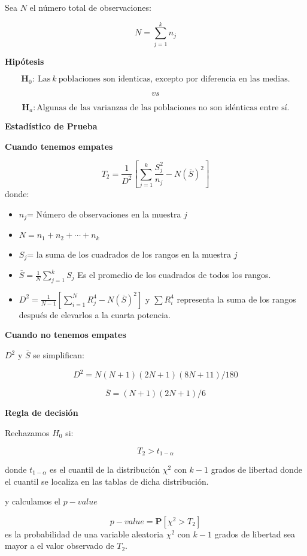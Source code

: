 \documentclass[
  a4paper,
  oneside,
  openany]{book}
\begin{document}
Sea \(N\) el número total de observaciones:

\[N=\sum_{j=1}^k n_j\]

\textbf{Hipótesis}

\[\textbf{H}_0: \ \mbox{Las} \  k  \ \mbox{poblaciones son identicas, excepto por diferencia en las medias.}\]

\[vs\]

\[\textbf{H}_a: \mbox{Algunas de las varianzas de las poblaciones no son idénticas entre sí.}\]

\textbf{Estadístico de Prueba}

\textbf{Cuando tenemos empates}

\[T_{2}= \frac{1}{D^2}\left[\sum_{j=1}^{k}\frac{S_{j}^2}{n_j}-N(\overline{S})^2\right]\]
donde:

\begin{itemize}
\item
  \(n_{j}\)= Número de observaciones en la muestra \(j\)
\item
  \(N= n_{1}+n_{2}+\cdots+n_{k}\)
\item
  \(S_{j}\)= la suma de los cuadrados de los rangos en la muestra \(j\)
\item
  \(\overline{S}= \frac{1}{N}\sum_{j=1}^{k}S_{j}\) Es el promedio de los cuadrados de todos los rangos.
\item
  \(D^2=\frac{1}{N-1}\left[\sum_{i=1}^{N}R^4_{j}-N(\overline{S})^2\right]\) y \(\sum{R_{i}^4}\) representa la suma de los rangos después de elevarlos a la cuarta potencia.
\end{itemize}

\textbf{Cuando no tenemos empates}

\(D^2\) y \(\overline{S}\) se simplifican:

\[D^2=N(N+1)(2N+1)(8N+11)/180\]

\[\overline{S}=(N+1)(2N+1)/6\]

\textbf{Regla de decisión}

Rechazamos \(H_0\) si:

\[T_{2}>t_{1-\alpha}\]

donde \(t_{1-\alpha}\) es el cuantil de la distribución \(\chi^2\) con \(k-1\) grados de libertad donde el cuantil se localiza en las tablas de dicha distribución.

y calculamos el \(p-value\)

\[p-value= \mathbf{P}\left[\chi^2>T_{2}\right]\]
es la probabilidad de una variable aleatoria \(\chi^2\) con \(k-1\) grados de libertad sea mayor a el valor observado de \(T_2\).
\end{document}
